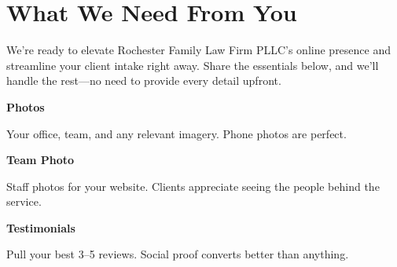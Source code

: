 \documentclass[11pt,letterpaper]{article}
\begin{document}
\vspace{0.2em}

\section*{What We Need From You}

We're ready to elevate Rochester Family Law Firm PLLC's online presence and streamline your client intake right away. Share the essentials below, and we'll handle the rest—no need to provide every detail upfront.

\vspace{0.12em}

\noindent\begin{minipage}[t]{0.48\textwidth}
\begin{tcolorbox}[colframe=accent-teal, boxrule=1pt, left=0.7em, right=0.7em, top=0.5em, bottom=0.5em, arc=4pt, boxsep=0pt]
{\bfseries\small\color{accent-teal}Photos}

\vspace{0.15em}

{\small Your office, team, and any relevant imagery. Phone photos are perfect.}
\end{tcolorbox}

\vspace{0.1em}

\begin{tcolorbox}[colframe=accent-teal, boxrule=1pt, left=0.7em, right=0.7em, top=0.5em, bottom=0.5em, arc=4pt, boxsep=0pt]
{\bfseries\small\color{accent-teal}Team Photo}

\vspace{0.15em}

{\small Staff photos for your website. Clients appreciate seeing the people behind the service.}
\end{tcolorbox}

\vspace{0.1em}

\begin{tcolorbox}[colframe=accent-teal, boxrule=1pt, left=0.7em, right=0.7em, top=0.5em, bottom=0.5em, arc=4pt, boxsep=0pt]
{\bfseries\small\color{accent-teal}Testimonials}

\vspace{0.15em}

{\small Pull your best 3--5 reviews. Social proof converts better than anything.}
\end{tcolorbox}
\end{minipage}
\hfill
\end{document}
